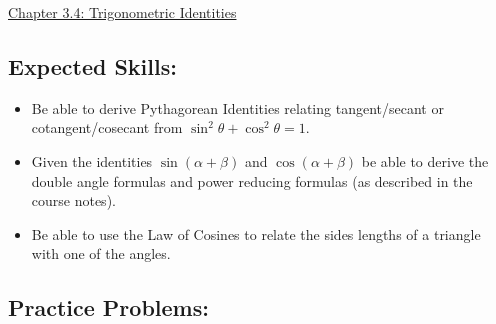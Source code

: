 \documentclass[12pt]{article}
\begin{document}
\begin{center}
\underline{\LARGE{Chapter 3.4: Trigonometric Identities}}
\end{center}

\subsection*{Expected Skills:}

\begin{itemize}

\item Be able to derive Pythagorean Identities relating tangent/secant or cotangent/cosecant from $\sin^2\theta+\cos^2\theta=1$.

\item  Given the identities $\sin(\alpha+\beta)$ and $\cos(\alpha+\beta)$ be able to derive the double angle formulas and power reducing formulas (as described in the course notes).

\item Be able to use the Law of Cosines to relate the sides lengths of a triangle with one of the angles.

\end{itemize}

\subsection*{Practice Problems: }
\end{document}
